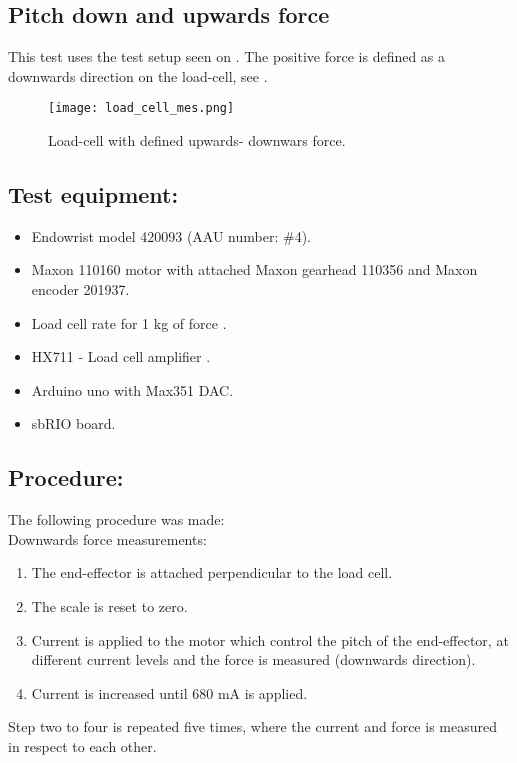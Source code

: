 \subsection{Pitch down and upwards force} %
This test uses the test setup seen on . The positive force is defined as a downwards direction on the load-cell, see .

\begin{figure}[H]
	\centering
	\texttt{[image: load\_cell\_mes.png]}
	\caption{Load-cell with defined upwards- downwars force.}
	\label{fig:mes_up_down}
\end{figure}


\subsection*{Test equipment:}
\begin{itemize}
\item Endowrist model 420093 (AAU number: \#4).
\item Maxon 110160 motor with attached Maxon gearhead 110356 and Maxon encoder 201937.
\item Load cell rate for 1 kg of force \cite{Load_cell_1kg}.
\item HX711 - Load cell amplifier \cite{HX711}.
\item Arduino uno with Max351 DAC.
\item sbRIO board.
\end{itemize}

\subsection*{Procedure:}
The following procedure was made:\\
Downwards force measurements:
\begin{enumerate}
\item The end-effector is attached perpendicular to the load cell. 
\item The scale is reset to zero.
\item Current is applied to the motor which control the pitch of the end-effector, at different current levels and the force is measured (downwards direction).
\item Current is increased until 680 mA is applied.
\end{enumerate}
Step two to four is repeated five times, where the current and force is measured in respect to each other. 

